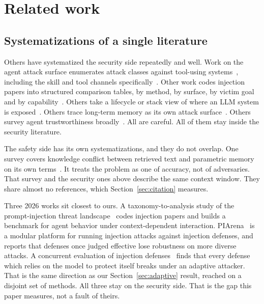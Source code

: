 \section{Related work} \label{sec:related}

\subsection{Systematizations of a single literature}

Others have systematized the security side repeatedly and well. Work on the
agent attack surface enumerates attack classes against tool-using
systems~\cite{dehghantanha-2026-sok,chu-2026-systematic}, including the skill
and tool channels specifically~\cite{jiang-2026-sok}. Other work codes
injection papers into structured comparison tables, by method, by surface, by
victim goal and by
capability~\cite{yusifov-2026-taxonomy,duarte-2026-systematic}. Others take a
lifecycle or stack view of where an LLM system is
exposed~\cite{natanzi-2026-lifecycle,nemure-2026-llm}. Others trace long-term
memory as its own attack surface~\cite{lin-2026-survey}. Others survey agent
trustworthiness broadly~\cite{qi-2026-trustworthy,mohan-2026-agent}. All are
careful. All of them stay inside the security literature.

The safety side has its own systematizations, and they do not
overlap. One survey covers knowledge conflict between retrieved text and
parametric memory on its own terms~\cite{xu-2024-knowledge}. It treats the
problem as one of accuracy, not of adversaries. That survey and the security
ones above describe the same context window. They share almost no references, which
Section~\ref{sec:citation} measures.

Three 2026 works sit closest to ours. A taxonomy-to-analysis study of the
prompt-injection threat landscape~\cite{wang-2026-landscape} codes injection
papers and builds a benchmark for agent behavior under context-dependent
interaction. PIArena~\cite{piarena-2026} is a modular platform for running
injection attacks against injection defenses, and reports that defenses once
judged effective lose robustness on more diverse attacks. A concurrent
evaluation of injection defenses~\cite{pidefense-eval-2026} finds that every
defense which relies on the model to protect itself breaks under an adaptive
attacker. That is the same direction as our Section~\ref{sec:adaptive} result,
reached on a disjoint set of methods. All three stay on the security side. That is the gap this paper measures,
not a fault of theirs.

